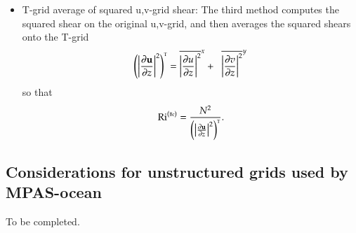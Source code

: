 \begin{itemize}
\item {\sc T-grid average of squared u,v-grid shear}: The third method
  computes the squared shear on the original u,v-grid, and then averages
  the squared shears onto the T-grid
\begin{equation}
  \left( \left| \frac{\partial {\bf u}}{\partial z} \right|^{2} \right)^{\mbox{\tiny T}}
  = \overline{  \left| \frac{\partial u}{\partial z} \right|^{2}   }^{x}
    +
   \; \; \overline{ \left| \frac{\partial v}{\partial z} \right|^{2}  }^{y}
\end{equation}
so that 
\begin{equation}
    \mbox{Ri}^{(\mbox{\tiny Bc})} = \frac{N^{2}} { \left( \left| \frac{\partial {\bf u}}{\partial z} \right|^{2} \right)^{\mbox{\tiny T}}}.
\end{equation}


\end{itemize}


\subsection{Considerations for unstructured grids used by MPAS-ocean}
\label{subsection:mpas-grid-richardson-number}

To be completed.  

